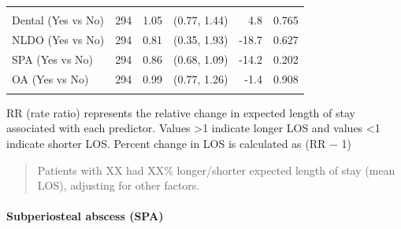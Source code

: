 \documentclass[
]{article}
\begin{document}
\begin{table}[t]
\begin{tabular*}{0.85\linewidth}{@{\extracolsep{\fill}}lrrrrr}
{\cellcolor[HTML]{FFF3CD}{Surgery During Admission (Yes vs No)}} & {\cellcolor[HTML]{FFF3CD}{294}} & {\cellcolor[HTML]{FFF3CD}{1.91}} & {\cellcolor[HTML]{FFF3CD}{(1.58, 2.31)}} & {\cellcolor[HTML]{FFF3CD}{90.7}} & {\cellcolor[HTML]{FFF3CD}{<0.001}} \\ 
Dental (Yes vs No) & 294 & 1.05 & (0.77, 1.44) & 4.8 & 0.765 \\ 
NLDO (Yes vs No) & 294 & 0.81 & (0.35, 1.93) & -18.7 & 0.627 \\ 
SPA (Yes vs No) & 294 & 0.86 & (0.68, 1.09) & -14.2 & 0.202 \\ 
OA (Yes vs No) & 294 & 0.99 & (0.77, 1.26) & -1.4 & 0.908 \\ 
{\cellcolor[HTML]{FFF3CD}{ICE (Yes vs No)}} & {\cellcolor[HTML]{FFF3CD}{294}} & {\cellcolor[HTML]{FFF3CD}{2.09}} & {\cellcolor[HTML]{FFF3CD}{(1.42, 3.14)}} & {\cellcolor[HTML]{FFF3CD}{109.4}} & {\cellcolor[HTML]{FFF3CD}{<0.001}} \\ 
\bottomrule
\end{tabular*}
\begin{minipage}{\linewidth}
RR (rate ratio) represents the relative change in expected
    length of stay associated with each predictor. Values >1 indicate longer 
    LOS and values <1 indicate shorter LOS. Percent change in LOS is calculated
    as (RR \ensuremath{-} 1) \\
\end{minipage}
\end{table}

\begin{quote}
Patients with XX had XX\% longer/shorter expected length of stay (mean LOS),
adjusting for other factors.
\end{quote}

\paragraph{Subperiosteal abscess (SPA)}\label{subperiosteal-abscess-spa}
\end{document}
